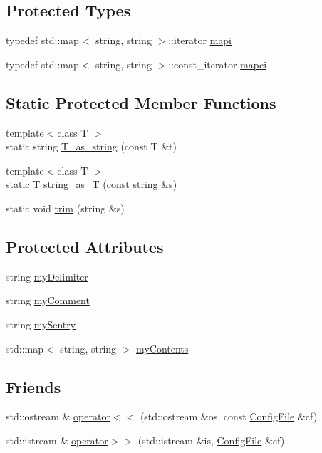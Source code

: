 \subsection*{Protected Types}
\begin{DoxyCompactItemize}
\item 
typedef std::map$<$ string, string $>$::iterator \hyperlink{classConfigFile_a91de4778982f558673be7465f33750f5}{mapi}
\item 
typedef std::map$<$ string, string $>$::const\_\-iterator \hyperlink{classConfigFile_af606aa032e366450b81792da67c984fc}{mapci}
\end{DoxyCompactItemize}
\subsection*{Static Protected Member Functions}
\begin{DoxyCompactItemize}
\item 
{\footnotesize template$<$class T $>$ }\\static string \hyperlink{classConfigFile_a0b2ef4a39ca6ea31d186c301f1f52700}{T\_\-as\_\-string} (const T \&t)
\item 
{\footnotesize template$<$class T $>$ }\\static T \hyperlink{classConfigFile_a741caa76c057b33332439cce2521b27e}{string\_\-as\_\-T} (const string \&s)
\item 
static void \hyperlink{classConfigFile_a6b445b393fcf42386a804fc4077fac10}{trim} (string \&s)
\end{DoxyCompactItemize}
\subsection*{Protected Attributes}
\begin{DoxyCompactItemize}
\item 
string \hyperlink{classConfigFile_ad63f3e259f665192b64fb3e83c701425}{myDelimiter}
\item 
string \hyperlink{classConfigFile_a2c60a141e8ad012b86a0642ec8ec638d}{myComment}
\item 
string \hyperlink{classConfigFile_af066ec1942c50848a055350029ebbca5}{mySentry}
\item 
std::map$<$ string, string $>$ \hyperlink{classConfigFile_a91b9b9e241d42bd3b1bb8b3e6355761f}{myContents}
\end{DoxyCompactItemize}
\subsection*{Friends}
\begin{DoxyCompactItemize}
\item 
std::ostream \& \hyperlink{classConfigFile_a8ccacbc37db1992a5515e2c72fc83ce6}{operator$<$$<$} (std::ostream \&os, const \hyperlink{classConfigFile}{ConfigFile} \&cf)
\item 
std::istream \& \hyperlink{classConfigFile_a25042475439039e70f90febe7d0e63ec}{operator$>$$>$} (std::istream \&is, \hyperlink{classConfigFile}{ConfigFile} \&cf)
\end{DoxyCompactItemize}


